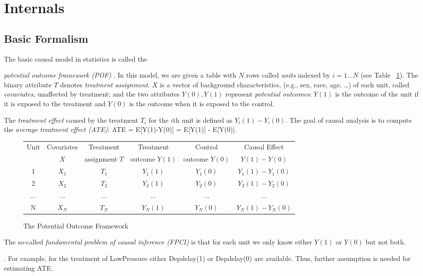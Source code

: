 \section{Internals}
\subsection{Basic Formalism}

The basic causal model in statistics is called the
{\em potential outcome framework (POF)} \cite{Rubin2005,holland1986statistics}.
In this model, we are given a table with $N$ rows called {\em units} indexed by $i=1 \ldots N$ (see
Table~ \ref{fig:causal:inference}).  The binary attribute $T$ denotes {\em treatment assignment}.
$X$ is a vector of
background characteristics, (e.g., sex, race, age, \ldots) of each unit,
called {\em covariates}, unaffected by treatment; and the two
attributes $Y(0), Y(1)$ represent {\em potential outcomes}: $Y(1)$ is
the outcome of the unit if it is exposed to the treatment and $Y(0)$
is the outcome when it is exposed to the control.

The {\em treatment effect}
caused by the treatment $T_i$ for the $i$th unit  is defined as $Y_i(1)-Y_i(0)$.
The goal of causal analysis is to compute the {\em average treatment
  effect (ATE)}:   ATE = E[Y(1)-Y(0)] = E[Y(1)] - E[Y(0)].
\begin{figure}
  \centering
{\scriptsize
  \begin{tabular}{|c|c|c|c|c|c|} \hline
    Unit & Covariates & Treatment & Treatment & Control & Causal  Effect \\
   & $X$ & assignment $T$ & outcome $Y(1)$ & outcome $Y(0)$ & $Y(1)-Y(0)$ \\
    \hline
    1 & $X_1$ & $T_1$ & $Y_1(1)$ & $Y_1(0)$ & $Y_1(1) - Y_1(0)$ \\
    2 & $X_2$ & $T_2$ & $Y_2(1)$ & $Y_2(0)$ & $Y_2(1) - Y_2(0)$ \\
    $\ldots$ & $\ldots$ & $\ldots$ & $\ldots$ & $\ldots$ & $\ldots$ \\
    N & $X_N$ & $T_N$ & $Y_N(1)$ & $Y_N(0)$ & $Y_N(1) - Y_N(0)$ \\ \hline
  \end{tabular}
}
\caption{The Potential Outcome Framework~\cite{Rubin2005}}
  \label{fig:causal:inference}
  \vspace{-3mm}
\end{figure}
\noindent
The so-called {\em fundamental problem of causal inference (FPCI)} is that
for each unit we only know either $Y(1)$ or $Y(0)$ but not both.
. For example, for the treatment of LowPressure
   either Depdelay(1) or Depdelay(0) are available.
Thus, further assumption is needed for estimating ATE. 

